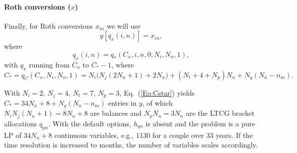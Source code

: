 \documentclass[fleqn,12pt]{report}
\begin{document}
\paragraph*{Roth conversions (\boldmath$x$)}
Finally, for Roth conversions $x_{in}$ we will use
\begin{equation}
	y[q_x(i, n)] = x_{i n},
\end{equation}
where
\begin{equation}
	q_x(i, n) = q_*(C_x, i, n, 0; N_i, N_n, 1),
\end{equation}
with $q_x$ running from $C_x$ to $C_* - 1$, where
\begin{equation}
	\label{Eq:Cstar}
C_* = q_C(C_x, N_i, N_n, 1) = N_i\bigl(N_j(2N_n + 1) + 2N_n\bigr) + (N_t + 4 + N_p) N_n + N_q(N_n - n_m).
\end{equation}

With $N_i = 2$, $N_j = 4$, $N_t = 7$, $N_p = 3$, Eq.~(\ref{Eq:Cstar}) yields
$C_* = 34 N_n + 8 + N_q(N_n - n_m)$ entries in $y$, of which $N_iN_j(N_n+1) = 8N_n + 8$ are balances
and $N_pN_n = 3N_n$ are the LTCG bracket allocations $q_{pn}$.
With the default options, $h_{qn}$ is absent and the problem is a pure LP of $34N_n + 8$ continuous
variables, e.g., 1130 for a couple over 33 years.
If the time resolution is increased to months, the number of variables scales accordingly.
\end{document}
